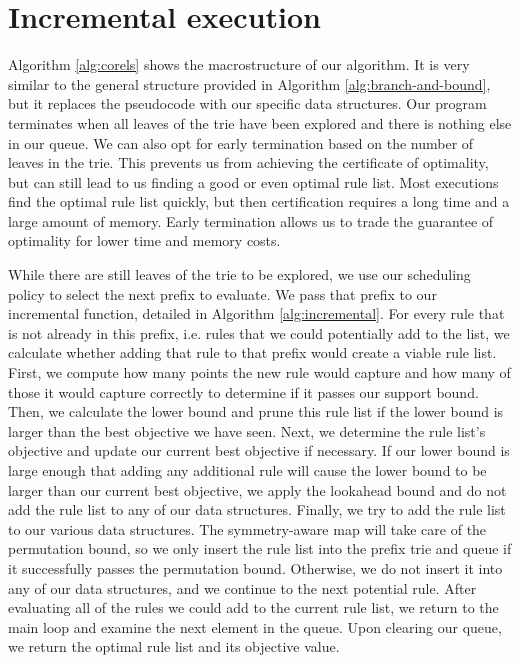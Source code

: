 \section{Incremental execution}
Algorithm \ref{alg:corels} shows the macrostructure of our algorithm.
It is very similar to the general structure provided in Algorithm \ref{alg:branch-and-bound}, but it replaces the pseudocode with our specific data structures. 
Our program terminates when all leaves of the trie have been explored and there is nothing else in our queue.
We can also opt for early termination based on the number of leaves in the trie.
This prevents us from achieving the certificate of optimality, but can still lead to us finding a good or even optimal rule list.
Most executions find the optimal rule list quickly, but then certification requires a long time and a large amount of memory.
Early termination allows us to trade the guarantee of optimality for lower time and memory costs.

While there are still leaves of the trie to be explored, we use our scheduling policy to select the next prefix to evaluate.
We pass that prefix to our incremental function, detailed in Algorithm \ref{alg:incremental}.
For every rule that is not already in this prefix, i.e. rules that we could potentially add to the list, we calculate whether adding that rule to that prefix would create a viable rule list.
First, we compute how many points the new rule would capture and how many of those it would capture correctly to determine if it passes our support bound.
Then, we calculate the lower bound and prune this rule list if the lower bound is larger than the best objective we have seen.
Next, we determine the rule list's objective and update our current best objective if necessary.
If our lower bound is large enough that adding any additional rule will cause the lower bound to be larger than our current best objective, we apply the lookahead bound and do not add the rule list to any of our data structures.
Finally, we try to add the rule list to our various data structures.
The symmetry-aware map will take care of the permutation bound, so we only insert the rule list into the prefix trie and queue if it successfully passes the permutation bound.
Otherwise, we do not insert it into any of our data structures, and we continue to the next potential rule.
After evaluating all of the rules we could add to the current rule list, we return to the main loop and examine the next element in the queue.
Upon clearing our queue, we return the optimal rule list and its objective value.

